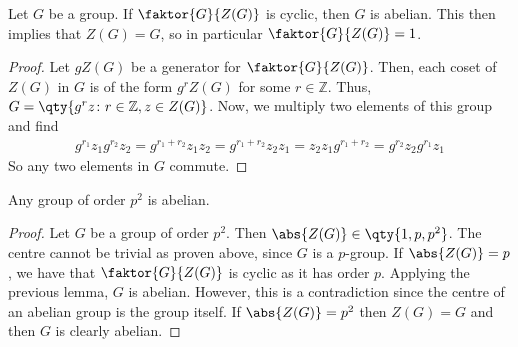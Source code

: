 \begin{lemma}
	Let $G$ be a group.
	If $\faktor{G}{Z(G)}$ is cyclic, then $G$ is abelian.
	This then implies that $Z(G) = G$, so in particular $\faktor{G}{Z(G)} = 1$.
\end{lemma}
\begin{proof}
	Let $g Z(G)$ be a generator for $\faktor{G}{Z(G)}$.
	Then, each coset of $Z(G)$ in $G$ is of the form $g^r Z(G)$ for some $r \in \mathbb Z$.
	Thus, $G = \qty{g^r z \colon r \in \mathbb Z, z \in Z(G)}$.
	Now, we multiply two elements of this group and find
	\begin{align*}
		g^{r_1} z_1 g^{r_2} z_2 = g^{r_1 + r_2} z_1 z_2 = g^{r_1 + r_2} z_2 z_1 = z_2 z_1 g^{r_1 + r_2} = g^{r_2} z_2 g^{r_1} z_1
	\end{align*}
	So any two elements in $G$ commute.
\end{proof}
\begin{corollary}
	Any group of order $p^2$ is abelian.
\end{corollary}
\begin{proof}
	Let $G$ be a group of order $p^2$.
	Then $\abs{Z(G)} \in \qty{1, p, p^2}$.
	The centre cannot be trivial as proven above, since $G$ is a $p$-group.
	If $\abs{Z(G)} = p$, we have that $\faktor{G}{Z(G)}$ is cyclic as it has order $p$.
	Applying the previous lemma, $G$ is abelian.
	However, this is a contradiction since the centre of an abelian group is the group itself.
	If $\abs{Z(G)} = p^2$ then $Z(G) = G$ and then $G$ is clearly abelian.
\end{proof}

